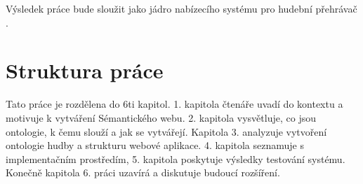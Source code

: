 Výsledek práce bude sloužit jako jádro nabízecího systému pro hudební přehrávač \cite{kunc}.

\section{Struktura práce}

Tato práce je rozdělena do 6ti kapitol. 1. kapitola čtenáře uvadí do kontextu a motivuje k vytváření Sémantického webu.
2. kapitola vysvětluje, co jsou ontologie, k čemu slouží a jak se vytvářejí.
Kapitola 3. analyzuje vytvoření ontologie hudby a strukturu webové aplikace.
4. kapitola seznamuje s implementačním prostředím, 5. kapitola poskytuje výsledky testování systému. 
Konečně kapitola 6. práci uzavírá a diskutuje budoucí rozšíření.
